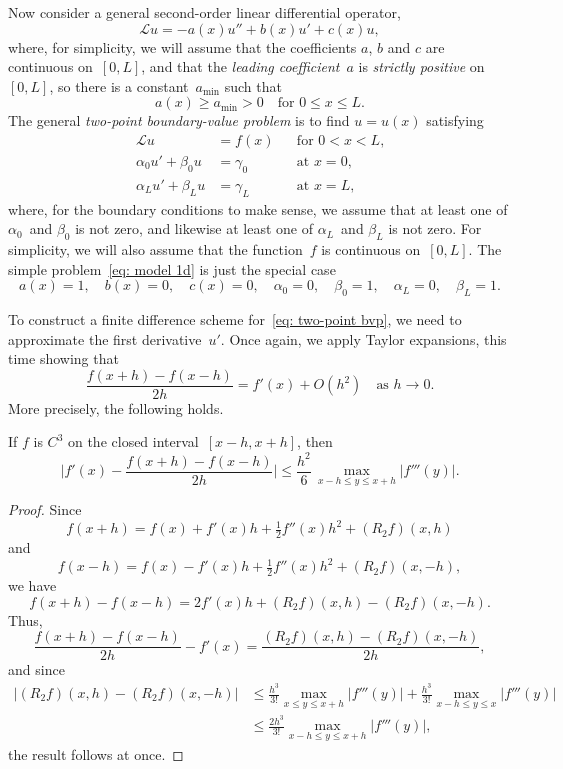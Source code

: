 Now consider a general second-order linear differential operator,
\[
\mathcal{L}u=-a(x)u''+b(x)u'+c(x)u,
\]
where, for simplicity, we will assume that the coefficients $a$, $b$ and 
$c$ are continuous on~$[0,L]$, and that the \emph{leading coefficient}~$a$ is 
\emph{strictly positive} on~$[0,L]$, so there is a constant~$a_{\min}$ such that
\begin{equation}\label{eq: ellipticity 1d}
a(x)\ge a_{\min}>0\quad\text{for $0\le x\le L$.}
\end{equation}
The general \emph{two-point boundary-value problem} is to find $u=u(x)$ 
satisfying
\begin{equation}\label{eq: two-point bvp}
\begin{aligned}
\mathcal{L}u&=f(x)&&\text{for $0<x<L$,}\\
\alpha_0u'+\beta_0u&=\gamma_0&&\text{at $x=0$,}\\
\alpha_Lu'+\beta_Lu&=\gamma_L&&\text{at $x=L$,}
\end{aligned}
\end{equation}
where, for the boundary conditions to make sense, we assume that at least one 
of $\alpha_0$~and $\beta_0$ is not zero, and likewise at least one of  
$\alpha_L$~and $\beta_L$ is not zero.  For simplicity, we will also assume that 
the function~$f$ is continuous on~$[0,L]$.  The simple 
problem~\eqref{eq: model 1d} is just the special case
\[
a(x)=1,\quad b(x)=0,\quad 
c(x)=0,\quad\alpha_0=0,\quad\beta_0=1,\quad\alpha_L=0,\quad\beta_L=1.
\]

To construct a finite difference scheme for~\eqref{eq: two-point bvp}, we need 
to approximate the first derivative~$u'$.  Once again, we apply Taylor 
expansions, this time showing that
\[
\frac{f(x+h)-f(x-h)}{2h}=f'(x)+O(h^2)\quad\text{as $h\to0$.}
\]
More precisely, the following holds.

\begin{theorem}\label{thm: first central diff}
If $f$ is $C^3$ on the closed interval~$[x-h,x+h]$, then
\[
\biggl|f'(x)-\frac{f(x+h)-f(x-h)}{2h}\biggr|
	\le\frac{h^2}{6}\,\max_{x-h\le y\le x+h}|f'''(y)|.
\]
\end{theorem}
\begin{proof}
Since
\[
f(x+h)=f(x)+f'(x)h+\tfrac12f''(x)h^2+(R_2f)(x,h)
\]
and
\[
f(x-h)=f(x)-f'(x)h+\tfrac12f''(x)h^2+(R_2f)(x,-h),
\]
we have
\[
f(x+h)-f(x-h)=2f'(x)h+(R_2f)(x,h)-(R_2f)(x,-h).
\]
Thus,
\[
\frac{f(x+h)-f(x-h)}{2h}-f'(x)=\frac{(R_2f)(x,h)-(R_2f)(x,-h)}{2h},
\]
and since
\begin{align*}
\bigl|(R_2f)(x,h)-(R_2f)(x,-h)\bigr|
	&\le\frac{h^3}{3!}\max_{x\le y\le x+h}|f'''(y)|
 	   +\frac{h^3}{3!}\max_{x-h\le y\le x}|f'''(y)|\\
	&\le\frac{2h^3}{3!}\max_{x-h\le y\le x+h}|f'''(y)|,
\end{align*}
the result follows at once.
\end{proof}

